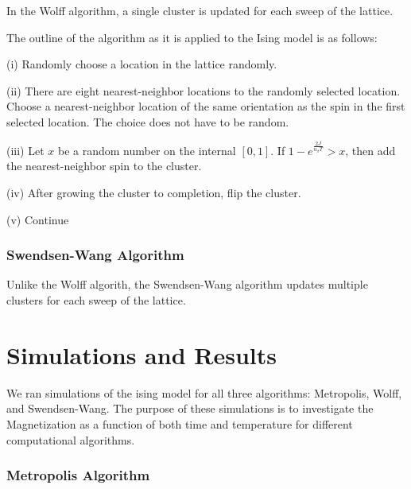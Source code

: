 \documentclass[11pt,letterpaper,fleqn]{article}
\begin{document}
In the Wolff algorithm, a single cluster is updated for each sweep of the lattice.


The outline of the algorithm as it is applied to the Ising model is as follows:
\newline

(i) Randomly choose a location in the lattice randomly.
\newline

(ii) There are eight nearest-neighbor locations to the randomly selected location.  Choose a nearest-neighbor location
of the same orientation as the spin in the first selected location.  The choice does not have to be random.
\newline

(iii) Let $x$ be a random number on the internal $[0,1]$. If $1 - e^{\frac{2J}{u_{\beta}T}} > x$, then add the 
nearest-neighbor spin to the cluster.
\newline

(iv) After growing the cluster to completion, flip the cluster.
\newline

(v) Continue 
\newline


\subsubsection*{Swendsen-Wang Algorithm}

Unlike the Wolff algorith, the Swendsen-Wang algorithm updates multiple clusters for each sweep of the lattice.




\section*{Simulations and Results}

We ran simulations of the ising model for all three algorithms: Metropolis, Wolff, and Swendsen-Wang.
The purpose of these simulations is to investigate the Magnetization as a function of both time and temperature
for different computational algorithms.


\subsubsection*{Metropolis Algorithm}
\end{document}
